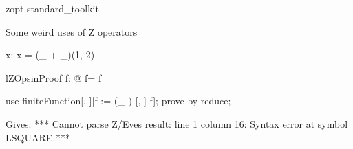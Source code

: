 \begin{zsection}
   \SECTION zopt \parents standard\_toolkit
\end{zsection}

Some weird uses of Z operators

\begin{axdef}
   x: \nat
\where
   x = (\_ + \_)(1, 2)
\end{axdef}

\begin{theorem}{lZOpsinProof}
   \forall f: \nat \fun \nat @ f\inv = f
\end{theorem}

\begin{zproof}[lZOpsinProof]
  use finiteFunction[\nat, \nat][f := (\_ \inv) [\nat, \nat] f];
  prove by reduce;
\end{zproof}

Gives:
***
Cannot parse Z/Eves result:
line 1 column 16: Syntax error at symbol LSQUARE
***